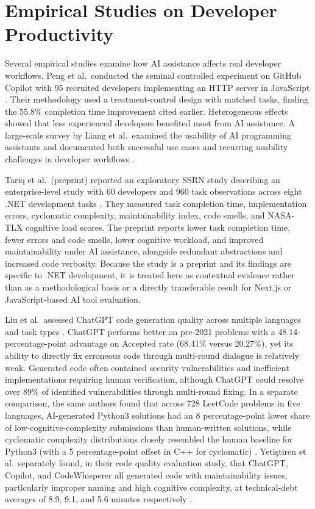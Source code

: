 \documentclass[12pt,a4paper]{report}
\begin{document}
\section{Empirical Studies on Developer Productivity}

Several empirical studies examine how AI assistance affects real developer workflows. Peng et al.\ conducted the seminal controlled experiment on GitHub Copilot with 95 recruited developers implementing an HTTP server in JavaScript \parencite{peng2023impact}. Their methodology used a treatment-control design with matched tasks, finding the 55.8\% completion time improvement cited earlier. Heterogeneous effects showed that less experienced developers benefited most from AI assistance. A large-scale survey by Liang et al.\ examined the usability of AI programming assistants and documented both successful use cases and recurring usability challenges in developer workflows \parencite{liang2024survey}.

Tariq et al.\ (preprint) reported an exploratory SSRN study describing an enterprise-level study with 60 developers and 960 task observations across eight .NET development tasks \parencite{tariq2026enterprise}. They measured task completion time, implementation errors, cyclomatic complexity, maintainability index, code smells, and NASA-TLX cognitive load scores. The preprint reports lower task completion time, fewer errors and code smells, lower cognitive workload, and improved maintainability under AI assistance, alongside redundant abstractions and increased code verbosity. Because the study is a preprint and its findings are specific to .NET development, it is treated here as contextual evidence rather than as a methodological basis or a directly transferable result for Next.js or JavaScript-based AI tool evaluation.

Liu et al.\ assessed ChatGPT code generation quality across multiple languages and task types \parencite{liu2024chatgpt}. ChatGPT performs better on pre-2021 problems with a 48.14-percentage-point advantage on Accepted rate (68.41\% versus 20.27\%), yet its ability to directly fix erroneous code through multi-round dialogue is relatively weak. Generated code often contained security vulnerabilities and inefficient implementations requiring human verification, although ChatGPT could resolve over 89\% of identified vulnerabilities through multi-round fixing. In a separate comparison, the same authors found that across 728 LeetCode problems in five languages, AI-generated Python3 solutions had an 8 percentage-point lower share of low-cognitive-complexity submissions than human-written solutions, while cyclomatic complexity distributions closely resembled the human baseline for Python3 (with a 5 percentage-point offset in C++ for cyclomatic) \parencite{liu2024chatgpt}. Yetiştiren et al.\ separately found, in their code quality evaluation study, that ChatGPT, Copilot, and CodeWhisperer all generated code with maintainability issues, particularly improper naming and high cognitive complexity, at technical-debt averages of 8.9, 9.1, and 5.6 minutes respectively \parencite{yetistiren2023evaluating}.
\end{document}
